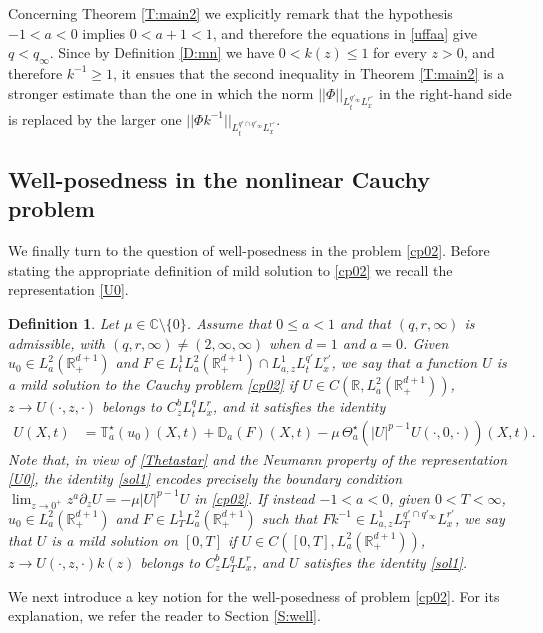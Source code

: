\documentclass[11pt,letter]{amsart}
\def \RN {\mathbb{R}_+^{d+1}}
\def \R {\mathbb{R}}
\newcommand{\p}{\partial}
\numberwithin{equation}{section}
\newcommand{\C}{\mathbb{C}}
\newtheorem{definition}[theorem]{Definition}
\numberwithin{equation}{section}
\begin{document}
Concerning Theorem \ref{T:main2} we explicitly remark that the hypothesis $-1<a<0$  implies $0<a+1<1$, and therefore  the equations in \eqref{uffaa} give $q<q_\infty$. 
Since by Definition \ref{D:mn} we have $0<k(z)\le 1$ for every $z>0$, and therefore $k^{-1}\ge 1$, it ensues that the second inequality in Theorem \ref{T:main2} is a stronger estimate than the one in which the norm $||\Phi||_{L^{q'_\infty}_t L^{r'}_x}$ in the right-hand side is replaced by the larger one $||\Phi k^{-1}||_{L^{q'\cap q'_\infty}_t L^{r'}_x}$.  


\subsection{Well-posedness in the nonlinear Cauchy problem} We finally turn to the question of well-posedness in the problem \eqref{cp02}. Before stating the appropriate definition of mild solution to \eqref{cp02} we recall the representation \eqref{U0}.

\begin{definition}\label{solution}
Let $\mu\in \C\setminus\{0\}$. Assume that $0\le a<1$ and that $(q,r,\infty)$ is admissible, with $(q,r,\infty)\not= (2,\infty,\infty)$ when $d=1$ and $a = 0$. Given $u_0\in L^2_a(\RN)$ and $F\in L^1_t L^2_a(\RN) \cap L^1_{a,z} L_t^{q'} L^{r'}_x$, we say that a function $U$ is a \emph{mild solution} to the Cauchy problem \eqref{cp02} if $U\in C(\R,L^2_a(\RN))$, $z\to U(\cdot,z,\cdot)$ belongs to $C^b_z L^q_tL^r_x$, and it satisfies the identity 
\begin{align}\label{sol1}
U(X,t) & = \mathbb T^\star_a(u_0)(X,t) +  \mathbb D_a(F)(X,t) - \mu\, \Theta^\star_a(|U|^{p-1} U(\cdot,0,\cdot))(X,t).
\end{align}
Note that, in view of \eqref{Thetastar} and the Neumann property of the representation \eqref{U0}, the identity \eqref{sol1} encodes precisely the boundary condition $\lim_{z\to 0^+} z^a\p_z U = -\mu|U|^{p-1}U$ in \eqref{cp02}.
If instead $-1<a<0$, given $0<T<\infty$, $u_0\in L^2_a(\RN)$ and $F\in L^1_T L^2_a(\RN)$ such that 
$F  k^{-1}\in L^1_{a,z} L^{q'\cap q'_\infty}_T L^{r'}_x $, we say that $U$ is a \emph{mild solution} on $[0,T]$ if $U\in C([0,T],L^2_a(\RN))$, $z \to U(\cdot,z,\cdot)k(z)$ belongs to $C^b_z L^q_T L^r_x$, and $U$ satisfies the identity \eqref{sol1}.
\end{definition} 
 


We next introduce a key notion for the well-posedness of problem \eqref{cp02}. For its explanation, we refer the reader to Section \ref{S:well}.
\end{document}
